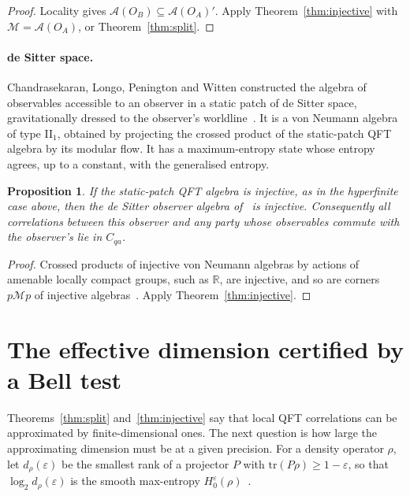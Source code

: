 \documentclass[11pt]{article}
\newtheorem{proposition}{Proposition}[section]
\theoremstyle{definition}\newtheorem{definition}{Definition}[section]
\theoremstyle{remark}\newtheorem*{remark}{Remark}
\newcommand{\A}{\mathcal A}
\newcommand{\M}{\mathcal M}
\newcommand{\Cqa}{C_{qa}}
\begin{document}
\begin{proof}
Locality gives $\A(O_B)\subseteq\A(O_A)'$. Apply Theorem~\ref{thm:injective} with $\M=\A(O_A)$, or Theorem~\ref{thm:split}.
\end{proof}

\paragraph{de Sitter space.} Chandrasekaran, Longo, Penington and Witten constructed the algebra of observables
accessible to an observer in a static patch of de Sitter space, gravitationally dressed to the observer's
worldline~\cite{CLPW}. It is a von Neumann algebra of type II$_1$, obtained by projecting the crossed product of the
static-patch QFT algebra by its modular flow. It has a maximum-entropy state whose entropy agrees, up to a constant, with
the generalised entropy.

\begin{proposition}
\label{prop:dS}
If the static-patch QFT algebra is injective, as in the hyperfinite case above, then the de Sitter observer algebra
of~\cite{CLPW} is injective. Consequently all correlations between this observer and any party whose observables commute
with the observer's lie in $\Cqa$.
\end{proposition}

\begin{proof}
Crossed products of injective von Neumann algebras by actions of amenable locally compact groups, such as $\mathbb R$, are
injective, and so are corners $p\M p$ of injective algebras~\cite{BrownOzawa,Connes}. Apply Theorem~\ref{thm:injective}.
\end{proof}

\section{The effective dimension certified by a Bell test}
\label{sec:effective}

Theorems~\ref{thm:split} and~\ref{thm:injective} say that local QFT correlations can be approximated by finite-dimensional
ones. The next question is how large the approximating dimension must be at a given precision. For a density operator
$\rho$, let $d_\rho(\varepsilon)$ be the smallest rank of a projector $P$ with $\mathrm{tr}(P\rho)\ge1-\varepsilon$, so that
$\log_2d_\rho(\varepsilon)$ is the smooth max-entropy $H_0^\varepsilon(\rho)$~\cite{RennerWolf}.
\end{document}
